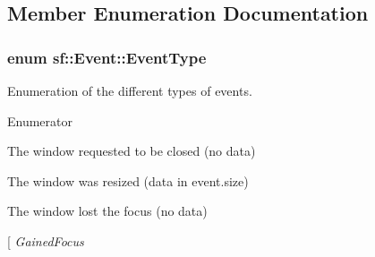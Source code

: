 \subsection{Member Enumeration Documentation}
\hypertarget{classsf_1_1_event_af41fa9ed45c02449030699f671331d4a}{
\subsubsection[{Event\+Type}]{\setlength{\rightskip}{0pt plus 5cm}enum {\bf sf\+::\+Event\+::\+Event\+Type}}}\label{classsf_1_1_event_af41fa9ed45c02449030699f671331d4a}


Enumeration of the different types of events. 

\begin{Desc}
\item[Enumerator]\par
\begin{description}
\item[{\em 
\hypertarget{classsf_1_1_event_af41fa9ed45c02449030699f671331d4aa316e4212e083f1dce79efd8d9e9c0a95}{Closed}\label{classsf_1_1_event_af41fa9ed45c02449030699f671331d4aa316e4212e083f1dce79efd8d9e9c0a95}
}]The window requested to be closed (no data) \item[{\em 
\hypertarget{classsf_1_1_event_af41fa9ed45c02449030699f671331d4aa67fd26d7e520bc6722db3ff47ef24941}{Resized}\label{classsf_1_1_event_af41fa9ed45c02449030699f671331d4aa67fd26d7e520bc6722db3ff47ef24941}
}]The window was resized (data in event.\+size) \item[{\em 
\hypertarget{classsf_1_1_event_af41fa9ed45c02449030699f671331d4aabd7877b5011a337268357c973e8347bd}{Lost\+Focus}\label{classsf_1_1_event_af41fa9ed45c02449030699f671331d4aabd7877b5011a337268357c973e8347bd}
}]The window lost the focus (no data) \item[{\em 
\hypertarget{classsf_1_1_event_af41fa9ed45c02449030699f671331d4aa8c5003ced508499933d540df8a6023ec}{Gained\+Focus}\label{classsf_1_1_event_af41fa9ed45c02449030699f671331d4aa8c5003ced508499933d540df8a6023ec}
}
\end{description}
\end{Desc}
